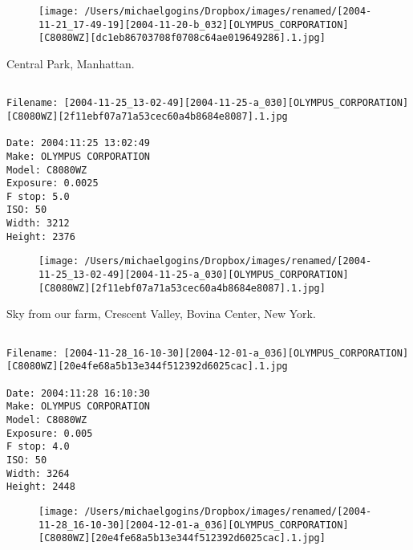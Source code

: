 \begin{figure}
\texttt{[image: /Users/michaelgogins/Dropbox/images/renamed/[2004-11-21\_17-49-19][2004-11-20-b\_032][OLYMPUS\_CORPORATION][C8080WZ][dc1eb86703708f0708c64ae019649286].1.jpg]}
\end{figure}
    
\clearpage
\onecolumn
\noindent Central Park, Manhattan.
\noindent
\begin{lstlisting}

Filename: [2004-11-25_13-02-49][2004-11-25-a_030][OLYMPUS_CORPORATION][C8080WZ][2f11ebf07a71a53cec60a4b8684e8087].1.jpg

Date: 2004:11:25 13:02:49
Make: OLYMPUS CORPORATION
Model: C8080WZ
Exposure: 0.0025
F stop: 5.0
ISO: 50
Width: 3212
Height: 2376
\end{lstlisting}
\clearpage

\begin{figure}
\texttt{[image: /Users/michaelgogins/Dropbox/images/renamed/[2004-11-25\_13-02-49][2004-11-25-a\_030][OLYMPUS\_CORPORATION][C8080WZ][2f11ebf07a71a53cec60a4b8684e8087].1.jpg]}
\end{figure}
    
\clearpage
\onecolumn
\noindent Sky from our farm, Crescent Valley, Bovina Center, New York.
\noindent
\begin{lstlisting}

Filename: [2004-11-28_16-10-30][2004-12-01-a_036][OLYMPUS_CORPORATION][C8080WZ][20e4fe68a5b13e344f512392d6025cac].1.jpg

Date: 2004:11:28 16:10:30
Make: OLYMPUS CORPORATION
Model: C8080WZ
Exposure: 0.005
F stop: 4.0
ISO: 50
Width: 3264
Height: 2448
\end{lstlisting}
\clearpage

\begin{figure}
\texttt{[image: /Users/michaelgogins/Dropbox/images/renamed/[2004-11-28\_16-10-30][2004-12-01-a\_036][OLYMPUS\_CORPORATION][C8080WZ][20e4fe68a5b13e344f512392d6025cac].1.jpg]}
\end{figure}
    
